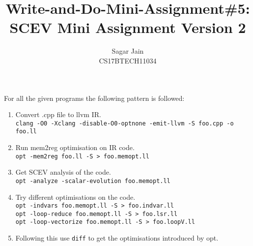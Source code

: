 \documentclass[12pt]{article}
\begin{document}
\title{Write-and-Do-Mini-Assignment\#5: SCEV Mini Assignment Version 2}
\author{Sagar Jain\\CS17BTECH11034}
\maketitle
For all the given programs the following pattern is followed:
\begin{enumerate}
\item Convert .cpp file to llvm IR.\\
\texttt{clang -O0 -Xclang -disable-O0-optnone -emit-llvm -S foo.cpp -o foo.ll}
\item Run mem2reg optimisation on IR code.\\
\texttt{opt -mem2reg foo.ll -S > foo.memopt.ll}
\item Get SCEV analysis of the code.\\
\texttt{opt -analyze -scalar-evolution foo.memopt.ll}
\item Try different optimisations on the code.\\
\texttt{opt -indvars foo.memopt.ll -S > foo.indvar.ll}\\
\texttt{opt -loop-reduce foo.memopt.ll -S > foo.lsr.ll}\\
\texttt{opt -loop-vectorize foo.memopt.ll -S > foo.loopV.ll}
\item Following this use \texttt{diff} to get the optimisations introduced by opt.
\end{enumerate}
\end{document}
